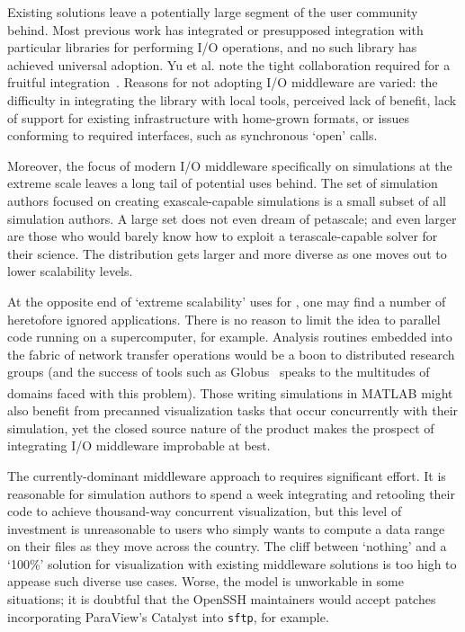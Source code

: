Existing solutions leave a potentially large segment of the user
community behind.  Most previous work has integrated or presupposed
integration with particular libraries for performing I/O operations,
and no such library has achieved universal adoption.
Yu et al. note the tight collaboration required
for a fruitful integration~\cite{Yu:2010:Combustion}.  Reasons for
not adopting I/O middleware are varied: the difficulty in integrating
the library with local tools, perceived lack of benefit, lack of
support for existing infrastructure with home-grown formats, or issues
conforming to required interfaces, such as synchronous `open' calls.


Moreover, the focus of modern I/O middleware specifically on
simulations at the extreme scale leaves a long tail of potential
\insitu{} uses behind.  The set of simulation authors focused on
creating exascale-capable simulations is a small subset of all
simulation authors.  A large set does not even dream of petascale;
and even larger are those who would barely know how to exploit a
terascale-capable solver for their science.  The distribution gets
larger and more diverse as one moves out to lower scalability levels.

At the opposite end of `extreme scalability' uses for \insitu{}, one
may find a number of heretofore ignored applications.  There is no
reason to limit the \insitu{} idea to parallel code running on a
supercomputer, for example.  Analysis routines embedded into the fabric
of network transfer operations would be a boon to distributed research
groups (and
the success of tools such as Globus~\cite{Foster:2011:Globus} speaks
to the multitudes of domains faced with this problem).  Those
writing simulations in MATLAB\textsuperscript{{\tiny \textregistered{}}} might
also benefit from precanned visualization tasks that occur concurrently
with their simulation, yet the closed source nature of the product
makes the prospect of integrating I/O middleware improbable at best.

The currently-dominant middleware approach to \insitu{} requires
significant effort.  It is reasonable for simulation authors to spend a
week integrating and retooling their code to achieve
thousand-way concurrent \insitu{} visualization, but this level of
investment is unreasonable to users who simply wants to compute a
data range on their files as they move across the country.  The cliff
between `nothing' and
a `100\%' solution for \insitu{} visualization with
existing middleware solutions is too high to appease such diverse
use cases.  Worse, the model is unworkable in some situations;
it is doubtful that the OpenSSH maintainers would accept patches
incorporating
ParaView's Catalyst into \texttt{sftp}, for example.

